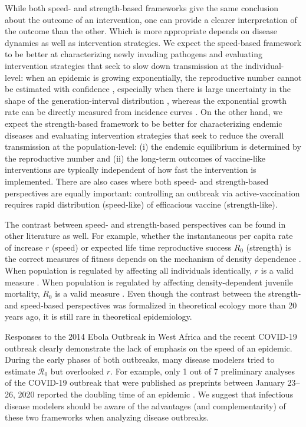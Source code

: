 \documentclass[12pt]{article}
\begin{document}
While both speed- and strength-based frameworks give the same conclusion about the outcome of an intervention, one can provide a clearer interpretation of the outcome than the other.
Which is more appropriate depends on disease dynamics as well as intervention strategies.
We expect the speed-based framework to be better at characterizing newly invading pathogens and evaluating intervention strategies that seek to slow down transmission at the individual-level:
when an epidemic is growing exponentially, the reproductive number cannot be estimated with confidence \citep{weitz2015modeling}, especially when there is large uncertainty in the shape of the generation-interval distribution \citep{park2020reconciling},
whereas the exponential growth rate can be directly measured from incidence curves \citep{ma2014estimating}.
On the other hand, we expect the strength-based framework to be better for characterizing endemic diseases and evaluating intervention strategies that seek to reduce the overall transmission at the population-level:
(i) the endemic equilibrium is determined by the reproductive number and (ii) the long-term outcomes of vaccine-like interventions are typically independent of how fast the intervention is implemented.
There are also cases where both speed- and strength-based perspectives are equally important:
controlling an outbreak via active-vaccination requires rapid distribution (speed-like) of efficacious vaccine (strength-like).

The contrast between speed- and strength-based perspectives can be found in other literature as well.
For example, whether the instantaneous per capita rate of increase $r$ (speed) or expected life time reproductive success $R_0$ (strength) is the correct measures of fitness depends on the mechanism of density dependence \citep{pasztor1996r0}.
When population is regulated by affecting all individuals identically, $r$ is a valid measure \citep{pasztor1996r0}.
When population is regulated by affecting density-dependent juvenile mortality, $R_0$ is a valid measure \citep{mylius1995evolutionarily}.
Even though the contrast between the strength- and speed-based perspectives was formalized in theoretical ecology more than 20 years ago, it is still rare in theoretical epidemiology.

Responses to the 2014 Ebola Outbreak in West Africa and the recent COVID-19 outbreak clearly demonstrate the lack of emphasis on the speed of an epidemic.
During the early phases of both outbreaks, many disease modelers tried to estimate $\mathcal R_0$ but overlooked $r$.
For example, only 1 out of 7 preliminary analyses of the COVID-19 outbreak that were published as preprints between January 23--26, 2020 reported the doubling time of an epidemic \citep{bedfordncov, imaincov, liuncov, majumderncov, readncov, riouncov, zhaoncov}.
We suggest that infectious disease modelers should be aware of the advantages (and complementarity) of these two frameworks when analyzing disease outbreaks.


\end{document}
